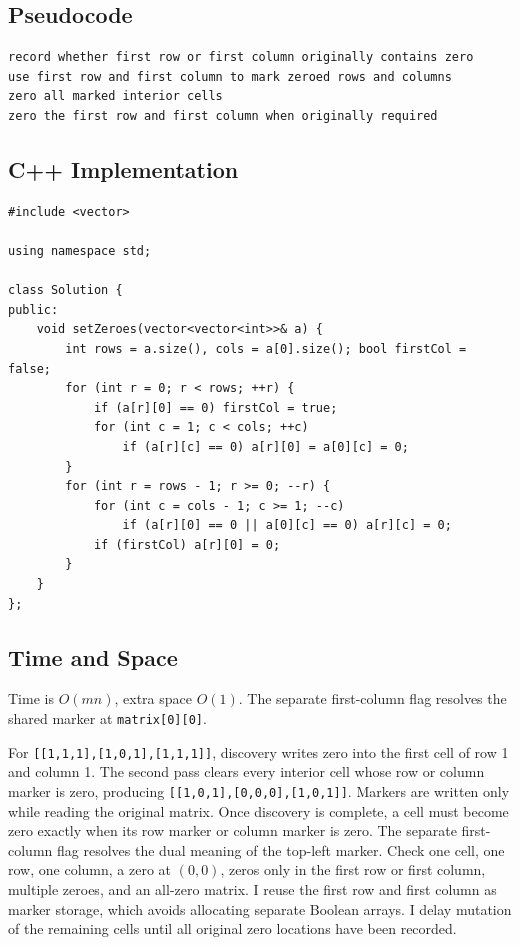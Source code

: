 \subsection{Pseudocode}
\begin{lstlisting}[style=pseudocode]
record whether first row or first column originally contains zero
use first row and first column to mark zeroed rows and columns
zero all marked interior cells
zero the first row and first column when originally required
\end{lstlisting}

\subsection{C++ Implementation}
\begin{lstlisting}[style=compactcode,caption={Complete C++ solution: Set Matrix Zeroes}]
#include <vector>

using namespace std;

class Solution {
public:
    void setZeroes(vector<vector<int>>& a) {
        int rows = a.size(), cols = a[0].size(); bool firstCol = false;
        for (int r = 0; r < rows; ++r) {
            if (a[r][0] == 0) firstCol = true;
            for (int c = 1; c < cols; ++c)
                if (a[r][c] == 0) a[r][0] = a[0][c] = 0;
        }
        for (int r = rows - 1; r >= 0; --r) {
            for (int c = cols - 1; c >= 1; --c)
                if (a[r][0] == 0 || a[0][c] == 0) a[r][c] = 0;
            if (firstCol) a[r][0] = 0;
        }
    }
};
\end{lstlisting}

\subsection{Time and Space}
Time is \(O(mn)\), extra space \(O(1)\). The separate first-column flag
resolves the shared marker at \texttt{matrix[0][0]}.

\lessonexpansion
  {For \texttt{[[1,1,1],[1,0,1],[1,1,1]]}, discovery writes zero into the
   first cell of row 1 and column 1. The second pass clears every interior cell
   whose row or column marker is zero, producing
   \texttt{[[1,0,1],[0,0,0],[1,0,1]]}.}
  {Markers are written only while reading the original matrix. Once discovery
   is complete, a cell must become zero exactly when its row marker or column
   marker is zero. The separate first-column flag resolves the dual meaning of
   the top-left marker.}
  {Check one cell, one row, one column, a zero at \((0,0)\), zeros only in the
   first row or first column, multiple zeroes, and an all-zero matrix.}
  {I reuse the first row and first column as marker storage, which avoids
   allocating separate Boolean arrays. I delay mutation of the remaining cells
   until all original zero locations have been recorded.}


